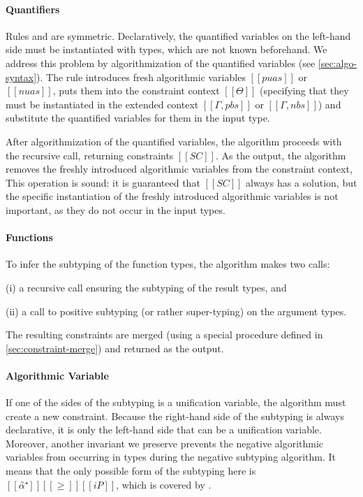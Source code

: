 \paragraph{Quantifiers}  
Rules  and 
 are symmetric. 
Declaratively, the quantified variables on the left-hand side must 
be instantiated with types, which are not known beforehand.
We address this problem by algorithmization 
of the quantified variables (see \cref{sec:algo-syntax}).
The rule introduces fresh algorithmic variables
$[[puas]]$ or $[[nuas]]$,
puts them into the constraint context $[[Θ]]$
(specifying that they must be instantiated in the extended context
$[[Γ, pbs]]$ or $[[Γ, nbs]]$) and substitute the quantified variables
for them in the input type. 

After algorithmization of the quantified variables, 
the algorithm proceeds with the recursive call, returning
constraints $[[SC]]$. As the output, the algorithm removes the freshly
introduced algorithmic variables from the constraint context, This operation is
sound: it is guaranteed that $[[SC]]$ always has a solution, but the specific
instantiation of the freshly introduced algorithmic variables is not important,
as they do not occur in the input types.

\paragraph{Functions}
To infer the subtyping of the function types, the algorithm
makes two calls: 
\begin{enumerate*}
  \item[(i)] a recursive call ensuring the subtyping of the result types, and
  \item[(ii)] a call to positive subtyping (or rather super-typing) on the argument types.
\end{enumerate*}
The resulting constraints are merged
(using a special procedure defined in \cref{sec:constraint-merge})
and returned as the output.

\paragraph{Algorithmic Variable}
If one of the sides of the subtyping is a unification variable,
the algorithm must create a new constraint. 
Because the right-hand side of the subtyping is always declarative,
it is only the left-hand side that can be a unification variable.
Moreover, another invariant we preserve prevents the negative
algorithmic variables from occurring in types during the
 negative subtyping algorithm. It means
that the only possible form of the subtyping here is $[[α̂⁺]] [[≥]] [[iP]]$,
which is covered by .

